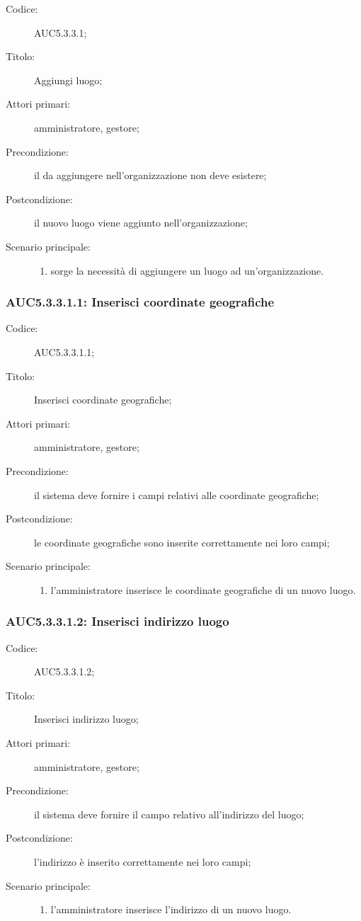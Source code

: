 \documentclass[../../../analisi-dei-requisiti.tex]{subfiles}
\begin{document}
\begin{description}
  \item[Codice:] AUC5.3.3.1;
  \item[Titolo:] Aggiungi luogo;
  \item[Attori primari:] amministratore, gestore;
  \item[Precondizione:] il  da aggiungere nell'organizzazione non deve esistere;
  \item[Postcondizione:] il nuovo luogo viene aggiunto nell'organizzazione;
  \item[Scenario principale:]
  \begin{enumerate}
    \item sorge la necessità di aggiungere un luogo ad un'organizzazione.
  \end{enumerate}
\end{description}

\subsubsection{AUC5.3.3.1.1: Inserisci coordinate geografiche}%
\label{subs:AUC5.3.3.1.1}
\begin{description}
  \item[Codice:] AUC5.3.3.1.1;
  \item[Titolo:] Inserisci coordinate geografiche;
  \item[Attori primari:] amministratore, gestore;
  \item[Precondizione:] il sistema deve fornire i campi relativi alle coordinate geografiche;
  \item[Postcondizione:] le coordinate geografiche sono inserite correttamente nei loro campi;
  \item[Scenario principale:]
  \begin{enumerate}
    \item l'amministratore inserisce le coordinate geografiche di un nuovo luogo.
  \end{enumerate}
\end{description}

\subsubsection{AUC5.3.3.1.2: Inserisci indirizzo luogo}%
\label{subs:AUC5.3.3.1.2}
\begin{description}
  \item[Codice:] AUC5.3.3.1.2;
  \item[Titolo:] Inserisci indirizzo luogo;
  \item[Attori primari:] amministratore, gestore;
  \item[Precondizione:] il sistema deve fornire il campo relativo all'indirizzo del luogo;
  \item[Postcondizione:] l'indirizzo è inserito correttamente nei loro campi;
  \item[Scenario principale:]
  \begin{enumerate}
    \item l'amministratore inserisce l'indirizzo di un nuovo luogo.
  \end{enumerate}
\end{description}
\end{document}
